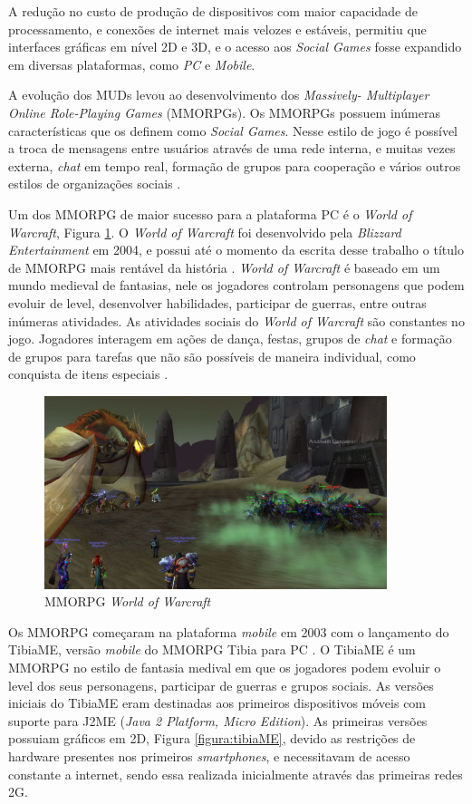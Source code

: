 A redução no custo de produção de dispositivos com maior capacidade de processamento, e conexões de internet mais velozes e estáveis, permitiu que interfaces gráficas em nível 2D e 3D, e o acesso aos \textit{Social Games} fosse expandido em diversas plataformas, como \textit{PC} e \textit{Mobile}.

A evolução dos MUDs levou ao desenvolvimento dos \textit{Massively- Multiplayer Online Role-Playing Games} (MMORPGs). Os MMORPGs possuem inúmeras características que os definem como \textit{Social Games}. Nesse estilo de jogo é possível a troca de mensagens entre usuários através de uma rede interna, e muitas vezes externa, \textit{chat} em tempo real, formação de grupos para cooperação e vários outros estilos de organizações sociais \cite{fields2014}.

Um dos MMORPG de maior sucesso para a plataforma PC é o \textit{World of Warcraft}, Figura \ref{figura:wow}. O \textit{World of Warcraft} foi desenvolvido pela \textit{Blizzard Entertainment} em 2004, e possui até o momento da escrita desse trabalho o título de MMORPG mais rentável da história \cite{thurau2010} \cite{omer2015}. \textit{World of Warcraft} é baseado em um mundo medieval de fantasias, nele os jogadores controlam personagens que podem evoluir de level, desenvolver habilidades, participar de guerras, entre outras inúmeras atividades. As atividades sociais do \textit{World of Warcraft} são constantes no jogo. Jogadores interagem em ações de dança, festas, grupos de \textit{chat} e formação de grupos para tarefas que não são possíveis de maneira individual, como conquista de itens especiais \cite{thurau2010} \cite{nardi2006}.

\begin{figure}[h]
  \centering
  \includegraphics[width=10cm]{figuras/wow.jpg}
  \caption{MMORPG \textit{World of Warcraft} \cite{kotaku}}
  \label{figura:wow}
\end{figure}

Os MMORPG começaram na plataforma \textit{mobile} em 2003 com o lançamento do TibiaME, versão \textit{mobile} do MMORPG Tibia para PC \cite{tibiaME}. O TibiaME é um MMORPG no estilo de fantasia medival em que os jogadores podem evoluir o level dos seus personagens, participar de guerras e grupos sociais. As versões iniciais do TibiaME eram destinadas aos primeiros dispositivos móveis com suporte para J2ME (\textit{Java 2 Platform, Micro Edition}). As primeiras versões possuiam gráficos em 2D, Figura \ref{figura:tibiaME}, devido as restrições de hardware presentes nos primeiros \textit{smartphones}, e necessitavam de acesso constante a internet, sendo essa realizada inicialmente através das primeiras redes 2G.

